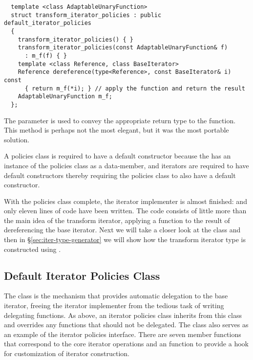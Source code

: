 \documentclass{netobjectdays}
\begin{document}
{\footnotesize
\begin{verbatim}
  template <class AdaptableUnaryFunction>
  struct transform_iterator_policies : public default_iterator_policies
  {
    transform_iterator_policies() { }
    transform_iterator_policies(const AdaptableUnaryFunction& f)
      : m_f(f) { }
    template <class Reference, class BaseIterator>
    Reference dereference(type<Reference>, const BaseIterator& i) const
      { return m_f(*i); } // apply the function and return the result
    AdaptableUnaryFunction m_f;
  };
\end{verbatim}
}

The  parameter is used to convey the appropriate
return type to the  function. This method is
perhaps not the most elegant, but it was the most portable solution.

A policies class is required to have a default constructor because the
 has an instance of the policies class as a
data-member, and iterators are required to have default constructors
thereby requiring the policies class to also have a default
constructor.

With the policies class complete, the iterator implementer is almost
finished: and only eleven lines of code have been written. The code
consists of little more than the main idea of the transform iterator,
applying a function to the result of dereferencing the base iterator.
Next we will take a closer look at the
 class and then in
\S\ref{sec:iter-type-generator} we will show how the transform
iterator type is constructed using .


\subsection{Default Iterator Policies Class}

The  class is the mechanism that
provides automatic delegation to the base iterator, freeing the
iterator implementer from the tedious task of writing delegating
functions. As above, an iterator policies class inherits from this
class and overrides any functions that should not be delegated. The
 class also serves as an example
of the iterator policies interface. There are seven member functions
that correspond to the core iterator operations and an
 function to provide a hook for customization of
iterator construction.
\end{document}
